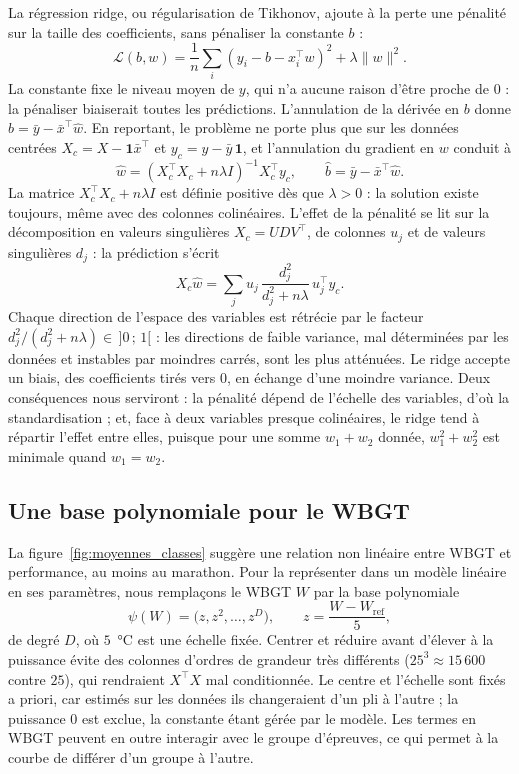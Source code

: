 \documentclass[11pt,a4paper]{article}
\begin{document}
La régression ridge, ou régularisation de Tikhonov, ajoute à la perte une pénalité sur la taille des coefficients,
sans pénaliser la constante $b$ :
\[
\mathcal{L}(b, w) = \frac1n\sum_i (y_i - b - x_i^\top w)^2 + \lambda\lVert w\rVert^2 .
\]
La constante fixe le niveau moyen de $y$, qui n'a aucune raison d'être proche de 0 : la pénaliser biaiserait toutes
les prédictions. L'annulation de la dérivée en $b$ donne $\hat b = \bar y - \bar x^\top \hat w$. En reportant, le
problème ne porte plus que sur les données centrées $X_c = X - \mathbf{1}\bar x^\top$ et $y_c = y - \bar y\,\mathbf{1}$,
et l'annulation du gradient en $w$ conduit à
\[
\hat w = (X_c^\top X_c + n\lambda I)^{-1}X_c^\top y_c,\qquad \hat b = \bar y - \bar x^\top \hat w.
\]
La matrice $X_c^\top X_c + n\lambda I$ est définie positive dès que $\lambda > 0$ : la solution existe toujours, même
avec des colonnes colinéaires. L'effet de la pénalité se lit sur la décomposition en valeurs singulières
$X_c = UDV^\top$, de colonnes $u_j$ et de valeurs singulières $d_j$ : la prédiction s'écrit
\[
X_c\hat w = \sum_j u_j\, \frac{d_j^2}{d_j^2 + n\lambda}\, u_j^\top y_c .
\]
Chaque direction de l'espace des variables est rétrécie par le facteur $d_j^2/(d_j^2 + n\lambda) \in \,]0\,;\,1[$ :
les directions de faible variance, mal déterminées par les données et instables par moindres carrés, sont les plus
atténuées. Le ridge accepte un biais, des coefficients tirés vers 0, en échange d'une moindre variance. Deux
conséquences nous serviront : la pénalité dépend de l'échelle des variables, d'où la standardisation ; et, face à deux
variables presque colinéaires, le ridge tend à répartir l'effet entre elles, puisque pour une somme $w_1 + w_2$ donnée,
$w_1^2 + w_2^2$ est minimale quand $w_1 = w_2$.

\subsection{Une base polynomiale pour le WBGT}\label{sec:polynome}

La figure~\ref{fig:moyennes_classes} suggère une relation non linéaire entre WBGT et performance, au moins au
marathon. Pour la représenter dans un modèle linéaire en ses paramètres, nous remplaçons le WBGT $W$ par la base
polynomiale
\[
\psi(W) = \big(z, z^2, \dots, z^D\big), \qquad z = \frac{W - W_{\text{ref}}}{5},
\]
de degré $D$, où $5$~°C est une échelle fixée. Centrer et réduire avant d'élever à la puissance évite des colonnes
d'ordres de grandeur très différents ($25^3 \approx 15\,600$ contre $25$), qui rendraient $X^\top X$ mal conditionnée.
Le centre et l'échelle sont fixés a priori, car estimés sur les données ils changeraient d'un pli à l'autre ; la
puissance 0 est exclue, la constante étant gérée par le modèle. Les termes en WBGT peuvent en outre interagir avec le
groupe d'épreuves, ce qui permet à la courbe de différer d'un groupe à l'autre.
\end{document}
